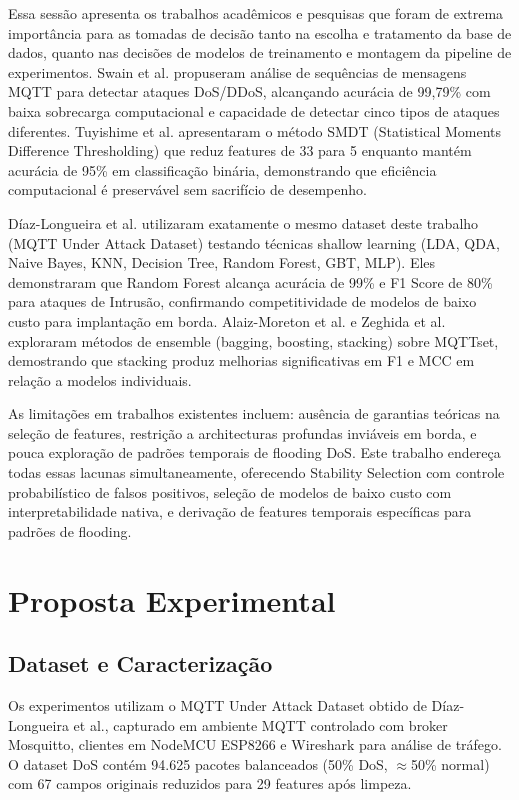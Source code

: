 \documentclass[12pt]{article}
\begin{document}
Essa sessão apresenta os trabalhos acadêmicos e pesquisas que foram de extrema importância para
as tomadas de decisão tanto na escolha e tratamento da base de dados, quanto nas decisões de 
modelos de treinamento e montagem da pipeline de experimentos. Swain et al. propuseram análise 
de sequências de mensagens MQTT para detectar ataques DoS/DDoS, alcançando acurácia de 99,79\% 
com baixa sobrecarga computacional e capacidade de detectar cinco tipos de ataques diferentes. 
Tuyishime et al. apresentaram o método SMDT (Statistical Moments Difference Thresholding) que
reduz features de 33 para 5 enquanto mantém acurácia de 95\% em classificação binária,
demonstrando que eficiência computacional é preservável sem sacrifício de desempenho.

Díaz-Longueira et al. utilizaram exatamente o mesmo dataset deste trabalho (MQTT Under Attack Dataset) testando técnicas shallow learning (LDA, QDA, Naive Bayes, KNN, Decision Tree, Random Forest, GBT, MLP). Eles demonstraram que Random Forest alcança acurácia de 99\% e F1 Score de 80\% para ataques de Intrusão, confirmando competitividade de modelos de baixo custo para implantação em borda. Alaiz-Moreton et al. e Zeghida et al. exploraram métodos de ensemble (bagging, boosting, stacking) sobre MQTTset, demostrando que stacking produz melhorias significativas em F1 e MCC em relação a modelos individuais.

As limitações em trabalhos existentes incluem: ausência de garantias teóricas na seleção de features, restrição a architecturas profundas inviáveis em borda, e pouca exploração de padrões temporais de flooding DoS. Este trabalho endereça todas essas lacunas simultaneamente, oferecendo Stability Selection com controle probabilístico de falsos positivos, seleção de modelos de baixo custo com interpretabilidade nativa, e derivação de features temporais específicas para padrões de flooding.


\section{Proposta Experimental}

\subsection{Dataset e Caracterização}

Os experimentos utilizam o MQTT Under Attack Dataset obtido de Díaz-Longueira et al., capturado em ambiente MQTT controlado com broker Mosquitto, clientes em NodeMCU ESP8266 e Wireshark para análise de tráfego. O dataset DoS contém 94.625 pacotes balanceados (50\% DoS, $\approx$50\% normal) com 67 campos originais reduzidos para 29 features após limpeza.
\end{document}
